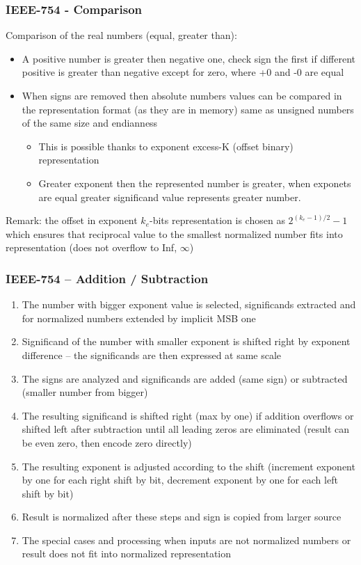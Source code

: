 \documentclass{beamer}
\begin{document}
\begin{frame}
\frametitle{IEEE-754 - Comparison}

Comparison of the real numbers (equal, greater than):
\begin{itemize}
\item A positive number is greater then negative one, check sign the first if different positive is greater than negative except for zero, where +0 and -0 are equal
\item When signs are removed then absolute numbers values can be compared in the representation format (as they are in memory) same as unsigned numbers of the same size and endianness
\begin{itemize}
\item This is possible thanks to exponent excess-K (offset binary) representation
\item Greater exponent then the represented number is greater, when exponets are equal greater significand value represents greater number.
\end{itemize}
\end{itemize}
\bigskip
Remark: the offset in exponent $k_e$-bits representation is chosen as $2^{(k_e-1)/2}-1$ which ensures that reciprocal value to the smallest normalized number fits into representation (does not overflow to Inf, $\infty$)

\end{frame}


\begin{frame}
\frametitle{IEEE-754 -- Addition / Subtraction}

\begin{enumerate}
\item The number with bigger exponent value is selected, significands extracted and for normalized numbers extended by implicit MSB one
\item Significand of the number with smaller exponent is shifted right by exponent difference -- the significands are then expressed at same scale
\item The signs are analyzed and significands are added (same sign) or subtracted (smaller number from bigger)
\item The resulting significand is shifted right (max by one) if addition overflows or shifted left after subtraction until all leading zeros are eliminated (result can be even zero, then encode zero directly)
\item The resulting exponent is adjusted according to the shift (increment exponent by one for each right shift by bit, decrement exponent by one for each left shift by bit)
\item Result is normalized after these steps and sign is copied from larger source
\item The special cases and processing when inputs are not normalized numbers or result does not fit into normalized representation 
\end{enumerate}

\end{frame}
\end{document}
